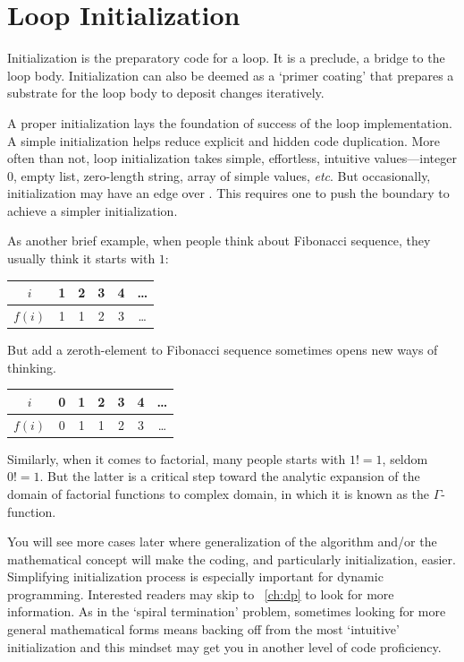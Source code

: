 \section{Loop Initialization}\label{sec:loopInitialization}

Initialization is the preparatory code for a loop.
It is a preclude, a bridge to the loop body.
Initialization can also be deemed as a `primer coating' that prepares a substrate for the loop
body to deposit changes iteratively.


A proper initialization lays the foundation of success of the loop implementation.
A simple initialization helps reduce explicit and hidden code duplication.
More often than not, loop initialization takes simple, effortless,
intuitive values---integer $0$, empty list, zero-length string, array of simple values,
\textit{etc}.
But occasionally, initialization  may have an edge over .
This requires one to push the boundary to achieve a simpler initialization.


As another brief example, when people think about Fibonacci sequence, they usually think it starts
with $1$:
\begin{table}[H]
    \centering
    \begin{tabular}{c|c|c|c|c|c}
        \hline
        $i$ & 1 & 2 & 3 & 4 & \ldots \\
        \hline
        $f(i)$ & 1 & 1 & 2 & 3 & \ldots \\
        \hline
    \end{tabular}
\end{table}
But add a zeroth-element to Fibonacci sequence sometimes opens new ways of thinking.
\begin{table}[H]
    \centering
    \begin{tabular}{c|c|c|c|c|c|c}
        \hline
        $i$ & 0 & 1 & 2 & 3 & 4 & \ldots \\
        \hline
        $f(i)$ & 0 & 1 & 1 & 2 & 3 & \ldots \\
        \hline
    \end{tabular}
\end{table}
Similarly, when it comes to factorial, many people starts with $1!=1$, seldom $0!=1$.
But the latter is a critical step toward the analytic expansion of the domain of factorial
functions to complex domain, in which it is known as the $\Gamma$-function.


You will see more cases later where generalization of the algorithm and/or the mathematical
concept will make the coding, and particularly initialization, easier.
Simplifying initialization process is especially important for dynamic programming.
Interested readers may skip to ~\autoref{ch:dp} to look for more information.
As in the `spiral termination' problem, sometimes looking for more general mathematical forms
means backing off from the most `intuitive' initialization and this mindset may get you in another
level of code proficiency.


